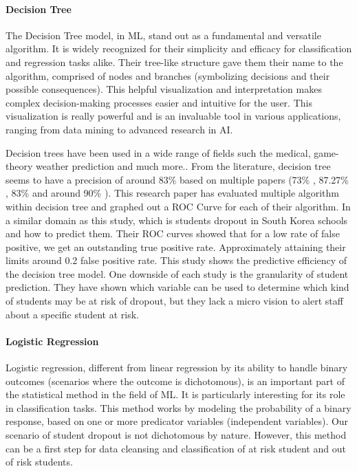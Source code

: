 \documentclass[conference]{IEEEtran}
\begin{document}
\vspace{8pt}
\paragraph{Decision Tree}
The Decision Tree model, in ML, stand out as a fundamental and versatile algorithm. It is widely recognized for their simplicity and efficacy for classification and regression tasks alike.
Their tree-like structure gave them their name to the algorithm, comprised of nodes and branches (symbolizing decisions and their possible consequences). This helpful visualization and interpretation makes complex decision-making processes easier and intuitive for the user. This visualization is really powerful and is an invaluable tool in various applications, ranging from data mining to advanced research in AI.

Decision trees have been used in a wide range of fields such the medical, game-theory weather prediction and much more.\cite{quinlan_induction_1986}.
From the literature, decision tree seems to have a precision of around 83\% based on multiple papers (73\% \cite{viloria_integration_2019}, 87.27\% \cite{ramirez_prediction_2018}, 83\%\cite{kemper_predicting_2020} and around 90\% \cite{tenpipat_student_2020}). This research paper has evaluated multiple algorithm within decision tree and graphed out a ROC Curve for each of their algorithm. In a similar domain as this study, which is students dropout in South Korea schools and how to predict them. Their ROC curves showed that for a low rate of false positive, we get an outstanding true positive rate. Approximately attaining their limits around 0.2 false positive rate\cite{lee_machine_2019}. This study shows the predictive efficiency of the decision tree model. 
One downside of each study is the granularity of student prediction. They have shown which variable can be used to determine which kind of students may be at risk of dropout, but they lack a micro vision to alert staff about a specific student at risk.

\vspace{8pt}
\paragraph{Logistic Regression}
Logistic regression, different from linear regression by its ability to handle binary outcomes (scenarios where the outcome is dichotomous), is an important part of the statistical method in the field of ML. It is particularly interesting for its role in classification tasks. This method works by modeling the probability of a binary response, based on one or more predicator variables (independent variables). 
Our scenario of student dropout is not dichotomous by nature. However, this method can be a first step for data cleansing and classification of at risk student and out of risk students.
\end{document}

